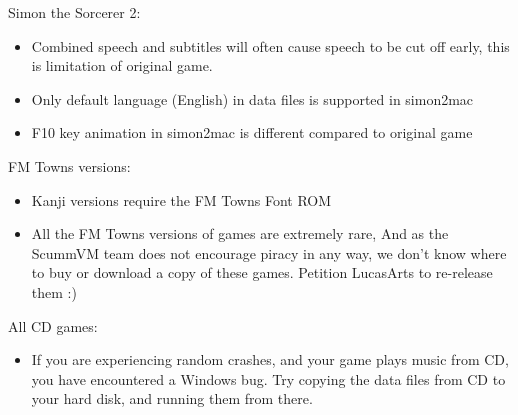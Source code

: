 Simon the Sorcerer 2:
  \begin{itemize}
  \item Combined speech and subtitles will often cause speech to be
                  cut off early, this is limitation of original game.
  \item Only default language (English) in data files is supported
                  in simon2mac
  \item F10 key animation in simon2mac is different compared to
                  original game
  \end{itemize}
FM Towns versions:
  \begin{itemize}
  \item Kanji versions require the FM Towns Font ROM
  \item All the FM Towns versions of games are extremely rare,
                  And as the ScummVM team does not encourage piracy in any
                  way, we don't know where to buy or download a copy of these
                  games. Petition LucasArts to re-release them :)
  \end{itemize}
All CD games:
  \begin{itemize}
  \item If you are experiencing random crashes, and your game
                 plays music from CD, you have encountered a Windows bug.
                 Try copying the data files from CD to your hard disk, and
                 running them from there.
  \end{itemize}
